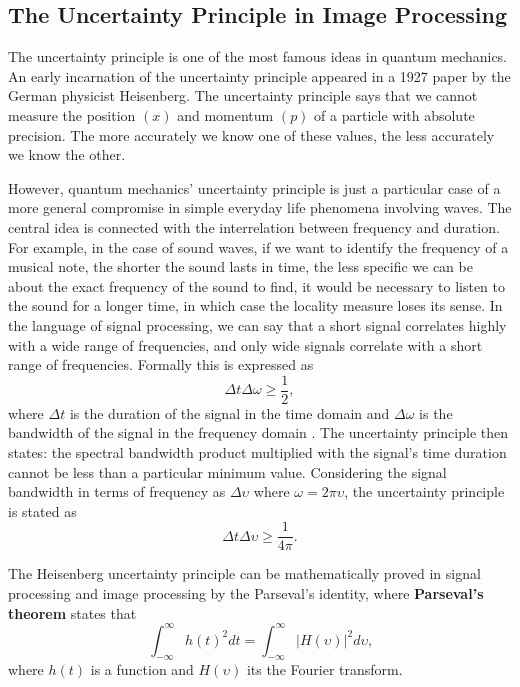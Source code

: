 \subsection{The Uncertainty Principle in Image Processing}\label{ch:uncertainty_principle}

The uncertainty principle is one of the most famous ideas in quantum mechanics. An early incarnation of the uncertainty principle appeared in a 1927 paper by the German physicist Heisenberg. The uncertainty principle says that we cannot measure the position $(x)$ and momentum $(p)$ of a particle with absolute precision. The more accurately we know one of these values, the less accurately we know the other.

However, quantum mechanics' uncertainty principle is just a particular case of a more general compromise in simple everyday life phenomena involving waves. The central idea is connected with the interrelation between frequency and duration. For example, in the case of sound waves, if we want to identify the frequency of a musical note, the shorter the sound lasts in time, the less specific we can be about the exact frequency of the sound to find, it would be necessary to listen to the sound for a longer time, in which case the locality measure loses its sense. In the language of signal processing, we can say that a short signal correlates highly with a wide range of frequencies, and only wide signals correlate with a short range of frequencies. Formally this is expressed as
\begin{equation}\label{eq:uncertainty_principle_rad}
	\Delta t\Delta \omega \geq \frac{1}{2},
\end{equation}
where $\Delta t$ is the duration of the signal in the time domain and $\Delta \omega$ is the bandwidth of the signal in the frequency domain \citep{Petrou.Sevilla:Book:2006}. The uncertainty principle then states: the spectral bandwidth product multiplied with the signal's time duration cannot be less than a particular minimum value. Considering the signal bandwidth in terms of frequency as $\Delta \upsilon$ where $\omega = 2\pi \upsilon$, the uncertainty principle is stated as 
\begin{equation}\label{eq:uncertainty_principle_freq}
	\Delta t\Delta \upsilon \geq \frac{1}{4\pi}.
\end{equation}

The Heisenberg uncertainty principle can be mathematically proved in signal processing and image processing by the Parseval's identity, where \textbf{Parseval's theorem} states that%
\begin{equation}\label{eq:parseval_theorem}
	\int_{-\infty}^{\infty} h(t)^2 dt = \int_{-\infty}^{\infty} |H(\upsilon)|^2 d\upsilon \text{,}
\end{equation}
where $h(t)$ is a function and $H(\upsilon)$ its the Fourier transform. 

